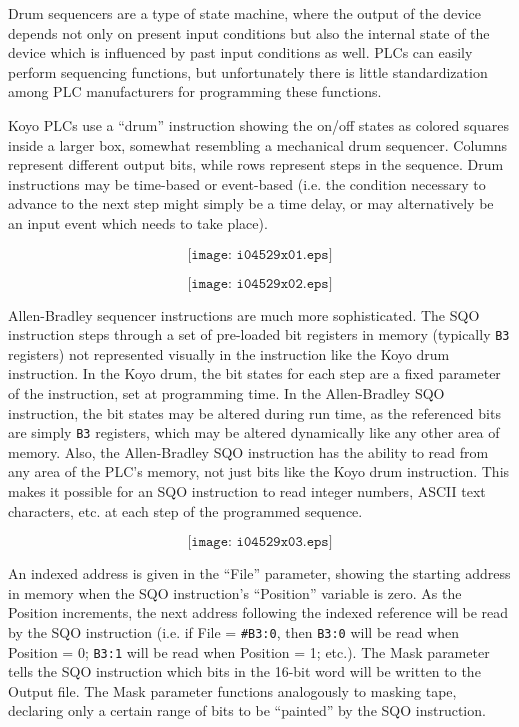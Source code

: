 \vskip 10pt

Drum sequencers are a type of state machine, where the output of the device depends not only on present input conditions but also the internal state of the device which is influenced by past input conditions as well.  PLCs can easily perform sequencing functions, but unfortunately there is little standardization among PLC manufacturers for programming these functions.

\vskip 10pt

Koyo PLCs use a ``drum'' instruction showing the on/off states as colored squares inside a larger box, somewhat resembling a mechanical drum sequencer.  Columns represent different output bits, while rows represent steps in the sequence.  Drum instructions may be time-based or event-based (i.e. the condition necessary to advance to the next step might simply be a time delay, or may alternatively be an input event which needs to take place).

$$\texttt{[image: i04529x01.eps]}$$

\filbreak

$$\texttt{[image: i04529x02.eps]}$$

\vskip 10pt

Allen-Bradley sequencer instructions are much more sophisticated.  The SQO instruction steps through a set of pre-loaded bit registers in memory (typically {\tt B3} registers) not represented visually in the instruction like the Koyo drum instruction.  In the Koyo drum, the bit states for each step are a fixed parameter of the instruction, set at programming time.  In the Allen-Bradley SQO instruction, the bit states may be altered during run time, as the referenced bits are simply {\tt B3} registers, which may be altered dynamically like any other area of memory.  Also, the Allen-Bradley SQO instruction has the ability to read from any area of the PLC's memory, not just bits like the Koyo drum instruction.  This makes it possible for an SQO instruction to read integer numbers, ASCII text characters, etc. at each step of the programmed sequence.

$$\texttt{[image: i04529x03.eps]}$$

An indexed address is given in the ``File'' parameter, showing the starting address in memory when the SQO instruction's ``Position'' variable is zero.  As the Position increments, the next address following the indexed reference will be read by the SQO instruction (i.e. if File = {\tt \#B3:0}, then {\tt B3:0} will be read when Position = 0; {\tt B3:1} will be read when Position = 1; etc.).  The Mask parameter tells the SQO instruction which bits in the 16-bit word will be written to the Output file.  The Mask parameter functions analogously to masking tape, declaring only a certain range of bits to be ``painted'' by the SQO instruction.

